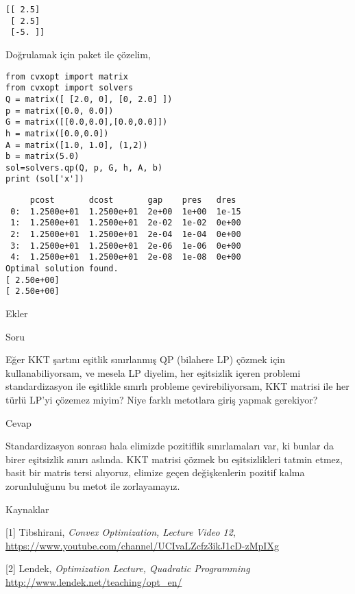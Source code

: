\documentclass[12pt,fleqn]{article}\usepackage{../../common}
\begin{document}
\begin{verbatim}
[[ 2.5]
 [ 2.5]
 [-5. ]]
\end{verbatim}

Doğrulamak için paket ile çözelim,

\begin{verbatim}
from cvxopt import matrix
from cvxopt import solvers
Q = matrix([ [2.0, 0], [0, 2.0] ])
p = matrix([0.0, 0.0])
G = matrix([[0.0,0.0],[0.0,0.0]])
h = matrix([0.0,0.0])
A = matrix([1.0, 1.0], (1,2))
b = matrix(5.0)
sol=solvers.qp(Q, p, G, h, A, b)
print (sol['x'])
\end{verbatim}

\begin{verbatim}
     pcost       dcost       gap    pres   dres
 0:  1.2500e+01  1.2500e+01  2e+00  1e+00  1e-15
 1:  1.2500e+01  1.2500e+01  2e-02  1e-02  0e+00
 2:  1.2500e+01  1.2500e+01  2e-04  1e-04  0e+00
 3:  1.2500e+01  1.2500e+01  2e-06  1e-06  0e+00
 4:  1.2500e+01  1.2500e+01  2e-08  1e-08  0e+00
Optimal solution found.
[ 2.50e+00]
[ 2.50e+00]
\end{verbatim}

Ekler

Soru

Eğer KKT şartını eşitlik sınırlanmış QP (bilahere LP) çözmek için
kullanabiliyorsam, ve mesela LP diyelim, her eşitsizlik içeren problemi
standardizasyon ile eşitlikle sınırlı probleme çevirebiliyorsam, KKT
matrisi ile her türlü LP'yi çözemez miyim? Niye farklı metotlara giriş
yapmak gerekiyor? 

Cevap

Standardizasyon sonrası hala elimizde pozitiflik sınırlamaları var, ki
bunlar da birer eşitsizlik sınırı aslında. KKT matrisi çözmek bu
eşitsizlikleri tatmin etmez, basit bir matris tersi alıyoruz, elimize geçen
değişkenlerin pozitif kalma zorunluluğunu bu metot ile zorlayamayız.

Kaynaklar

[1] Tibshirani, {\em Convex Optimization, Lecture Video 12}, 
\url{https://www.youtube.com/channel/UCIvaLZcfz3ikJ1cD-zMpIXg}   

[2] Lendek, {\em Optimization Lecture, Quadratic Programming}
\url{http://www.lendek.net/teaching/opt_en/}
\end{document}
